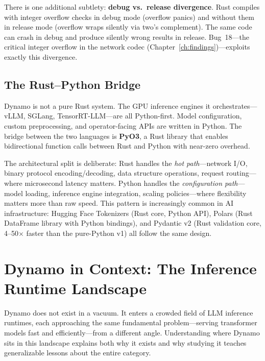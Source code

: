 There is one additional subtlety: \textbf{debug vs.\ release divergence}. Rust compiles with integer overflow checks in debug mode (overflow panics) and without them in release mode (overflow wraps silently via two's complement). The same code can crash in debug and produce silently wrong results in release. Bug~18---the critical integer overflow in the network codec (Chapter~\ref{ch:findings})---exploits exactly this divergence.

\subsection{The Rust--Python Bridge}

%
Dynamo is not a pure Rust system. The GPU inference engines it orchestrates---vLLM, SGLang, TensorRT-LLM---are all Python-first. Model configuration, custom preprocessing, and operator-facing APIs are written in Python. The bridge between the two languages is \textbf{PyO3}, a Rust library that enables bidirectional function calls between Rust and Python with near-zero overhead.

The architectural split is deliberate: Rust handles the \emph{hot path}---network I/O, binary protocol encoding/decoding, data structure operations, request routing---where microsecond latency matters. Python handles the \emph{configuration path}---model loading, inference engine integration, scaling policies---where flexibility matters more than raw speed. This pattern is increasingly common in AI infrastructure: Hugging Face Tokenizers (Rust core, Python API), Polars (Rust DataFrame library with Python bindings), and Pydantic v2 (Rust validation core, 4--50$\times$ faster than the pure-Python v1) all follow the same design.

\section{Dynamo in Context: The Inference Runtime Landscape}

Dynamo does not exist in a vacuum. It enters a crowded field of LLM inference runtimes, each approaching the same fundamental problem---serving transformer models fast and efficiently---from a different angle. Understanding where Dynamo sits in this landscape explains both why it exists and why studying it teaches generalizable lessons about the entire category.

